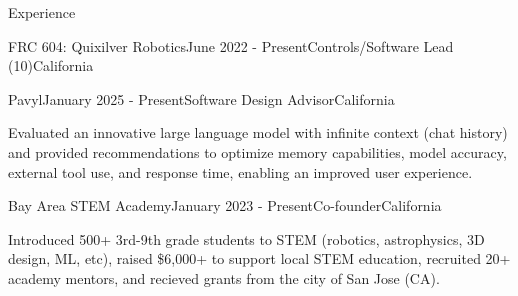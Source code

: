 \documentclass[
  10pt, %
]{resume}
\begin{document}
\begin{rSection}{Experience}
\begin{rSubsection}{FRC 604: Quixilver Robotics}{June 2022 - Present}{Controls/Software Lead (10)}{California}
  \end{rSubsection}
        
  \begin{rSubsection}{Pavyl}{January 2025 - Present}{Software Design Advisor}{California}
    
    \item Evaluated an innovative large language model with infinite context (chat history) and provided recommendations to optimize memory capabilities, model accuracy, external tool use, and response time, enabling an improved user experience.
    
  \end{rSubsection}
        
  \begin{rSubsection}{Bay Area STEM Academy}{January 2023 - Present}{Co-founder}{California}
    
    \item Introduced 500+ 3rd-9th grade students to STEM (robotics, astrophysics, 3D design, ML, etc), raised \$6,000+ to support local STEM education, recruited 20+ academy mentors, and recieved grants from the city of San Jose (CA).
    
  \end{rSubsection}
        
	
\end{rSection}

\end{document}

